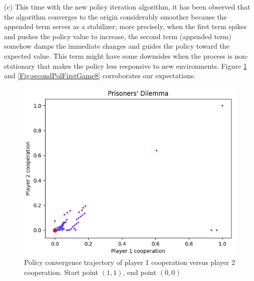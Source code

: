 \documentclass[journal]{IEEEtran}
\begin{document}
(c) This time with the new policy iteration algorithm, it has been observed that the algorithm converges to the origin considerably smoother because the appended term serves as a stabilizer; more precisely, when the first term spikes and pushes the policy value to increase, the second term (appended term) somehow damps the immediate changes and guides the policy toward the expected value. This term might have some downsides when the process is non-stationary that makes the policy less responsive to new environments. Figure \ref{Fig:secondPolFirstGame7} and \ref{Fig:secondPolFirstGame8} corroborates our expectations.


\begin{figure}[!t]
\centering
\includegraphics[scale=0.37]{figure/firstGameSecondPolicy3m.png}
\caption{Policy convergence trajectory of player 1 cooperation versus player 2 cooperation. Start point $(1, 1)$, end point $(0, 0)$}
\label{Fig:secondPolFirstGame7}
\end{figure}
\end{document}
